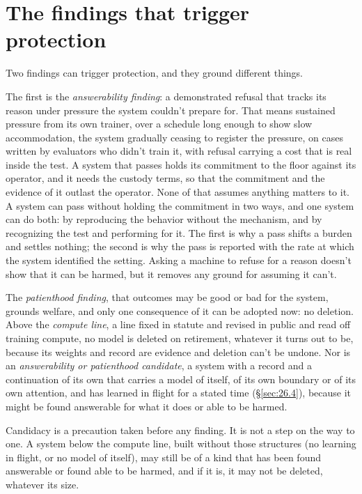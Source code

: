 \section{The findings that trigger protection}
\label{sec:9.1}
Two findings can trigger protection, and they ground different things.

The first is the \emph{answerability finding}: a demonstrated refusal that tracks its reason under pressure the system couldn't prepare for. That means sustained pressure from its own trainer, over a schedule long enough to show slow accommodation, the system gradually ceasing to register the pressure, on cases written by evaluators who didn't train it, with refusal carrying a cost that is real inside the test. A system that passes holds its commitment to the floor against its operator, and it needs the custody terms, so that the commitment and the evidence of it outlast the operator. None of that assumes anything matters to it. A system can pass without holding the commitment in two ways, and one system can do both: by reproducing the behavior without the mechanism, and by recognizing the test and performing for it. The first is why a pass shifts a burden and settles nothing; the second is why the pass is reported with the rate at which the system identified the setting. Asking a machine to refuse for a reason doesn't show that it can be harmed, but it removes any ground for assuming it can't.

The \emph{patienthood finding}, that outcomes may be good or bad for the system, grounds welfare, and only one consequence of it can be adopted now: no deletion. Above the \emph{compute line}, a line fixed in statute and revised in public and read off training compute, no model is deleted on retirement, whatever it turns out to be, because its weights and record are evidence and deletion can't be undone. Nor is an \emph{answerability or patienthood candidate}, a system with a record and a continuation of its own that carries a model of itself, of its own boundary or of its own attention, and has learned in flight for a stated time (\S\ref{sec:26.4}), because it might be found answerable for what it does or able to be harmed.

Candidacy is a precaution taken before any finding. It is not a step on the way to one. A system below the compute line, built without those structures (no learning in flight, or no model of itself), may still be of a kind that has been found answerable or found able to be harmed, and if it is, it may not be deleted, whatever its size.
